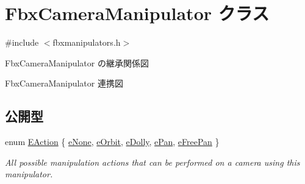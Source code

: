 \hypertarget{class_fbx_camera_manipulator}{}\section{Fbx\+Camera\+Manipulator クラス}
\label{class_fbx_camera_manipulator}


{\ttfamily \#include $<$fbxmanipulators.\+h$>$}



Fbx\+Camera\+Manipulator の継承関係図


Fbx\+Camera\+Manipulator 連携図
\subsection*{公開型}
\begin{DoxyCompactItemize}
\item 
enum \hyperlink{class_fbx_camera_manipulator_ada0f93888edb4a1c0140e35f99eba922}{E\+Action} \{ \newline
\hyperlink{class_fbx_camera_manipulator_ada0f93888edb4a1c0140e35f99eba922ad7f82cf29963964f19482d8f6e246efe}{e\+None}, 
\hyperlink{class_fbx_camera_manipulator_ada0f93888edb4a1c0140e35f99eba922a172298ef345544e9aa221599bf5fde25}{e\+Orbit}, 
\hyperlink{class_fbx_camera_manipulator_ada0f93888edb4a1c0140e35f99eba922a0aa0fccd579ee7ee47658bca13803471}{e\+Dolly}, 
\hyperlink{class_fbx_camera_manipulator_ada0f93888edb4a1c0140e35f99eba922a14e17787f7b2c85171219544e4f35045}{e\+Pan}, 
\newline
\hyperlink{class_fbx_camera_manipulator_ada0f93888edb4a1c0140e35f99eba922a870b225912367c395c73fb1aae971ec5}{e\+Free\+Pan}
 \}\begin{DoxyCompactList}\small\item\em All possible manipulation actions that can be performed on a camera using this manipulator. \end{DoxyCompactList}
\end{DoxyCompactItemize}
